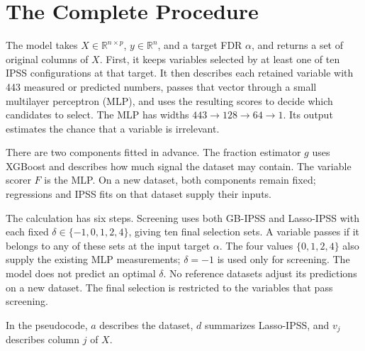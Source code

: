 \documentclass[10pt,letterpaper]{article}
\newcommand{\R}{\mathbb{R}}
\begin{document}
\section{The Complete Procedure}\label{sec:overview}
The model takes $X\in\R^{n\times p}$, $y\in\R^n$, and a target FDR
$\alpha$, and returns a set of original columns of $X$. First, it keeps
variables selected by at least one of ten IPSS configurations at that target.
It then describes each retained variable with 443 measured or predicted numbers,
passes that vector through a small multilayer perceptron (MLP), and uses the
resulting scores to decide which candidates to select. The MLP has widths
$443\to128\to64\to1$. Its output estimates the chance that a variable is irrelevant.

There are two components fitted in advance. The fraction estimator $g$
uses XGBoost and describes how much signal the dataset may contain.
The variable scorer $F$ is the MLP. On a new dataset, both components
remain fixed; regressions and IPSS fits on that dataset supply their inputs.

The calculation has six steps. Screening uses both GB-IPSS and Lasso-IPSS
with each fixed $\delta\in\{-1,0,1,2,4\}$, giving ten final selection sets.
A variable passes if it belongs to any of these sets at the input target $\alpha$.
The four values $\{0,1,2,4\}$ also supply the existing MLP measurements;
$\delta=-1$ is used only for screening. The model does not predict an optimal
$\delta$. No reference datasets adjust its predictions on a new dataset.
The final selection is restricted to the variables that pass screening.

In the pseudocode, $a$ describes the dataset, $d$ summarizes
Lasso-IPSS, and $v_j$ describes column $j$ of $X$.
\end{document}
